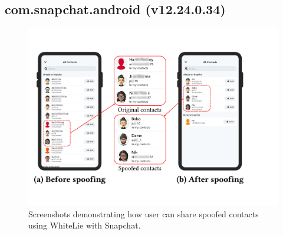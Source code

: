 
\subsection{com.snapchat.android (v12.24.0.34)}
\label{sec:sc_case_study}

\begin{figure}[t]
    \centering
    \includegraphics[width=\linewidth]{Figures/Case Studies/snapchat_screenshots.pdf}
    \caption{Screenshots demonstrating how user can share spoofed contacts using WhiteLie with Snapchat.}
    \label{fig:case-study-snapchat}
\end{figure}

